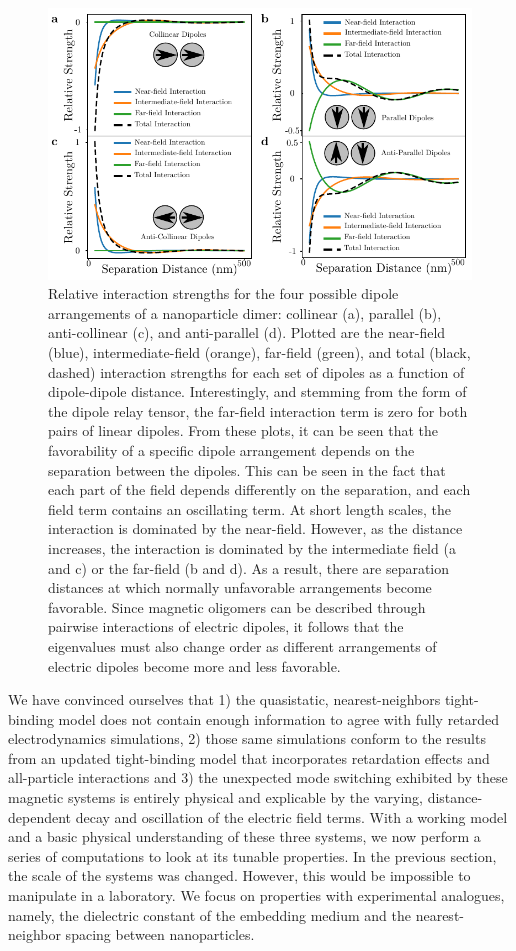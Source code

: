 \documentclass[journal=apchd5,manuscript=article]{achemso}
\begin{document}
\begin{figure}
\centering
\includegraphics[width=0.6\paperwidth]{dimer_interaction.pdf}
\caption{Relative interaction strengths for the four possible dipole arrangements of a nanoparticle dimer: collinear (a), parallel (b), anti-collinear (c), and anti-parallel (d). Plotted are the near-field (blue), intermediate-field (orange), far-field (green), and total (black, dashed) interaction strengths for each set of dipoles as a function of dipole-dipole distance. Interestingly, and stemming from the form of the dipole relay tensor, the far-field interaction term is zero for both pairs of linear dipoles. From these plots, it can be seen that the favorability of a specific dipole arrangement depends on the separation between the dipoles. This can be seen in the fact that each part of the field depends differently on the separation, and each field term contains an oscillating term. At short length scales, the interaction is dominated by the near-field. However, as the distance increases, the interaction is dominated by the intermediate field (a and c) or the far-field (b and d). As a result, there are separation distances at which normally unfavorable arrangements become favorable. Since magnetic oligomers can be described through pairwise interactions of electric dipoles, it follows that the eigenvalues must also change order as different arrangements of electric dipoles become more and less favorable.}
\label{dimers}
\end{figure}

We have convinced ourselves that 1) the quasistatic, nearest-neighbors tight-binding model does not contain enough information to agree with fully retarded electrodynamics simulations, 2) those same simulations conform to the results from an updated tight-binding model that incorporates retardation effects and all-particle interactions and 3) the unexpected mode switching exhibited by these magnetic systems is entirely physical and explicable by the varying, distance-dependent decay and oscillation of the electric field terms. With a working model and a basic physical understanding of these three systems, we now perform a series of computations to look at its tunable properties. In the previous section, the scale of the systems was changed. However, this would be impossible to manipulate in a laboratory. We focus on properties with experimental analogues, namely, the dielectric constant of the embedding medium and the nearest-neighbor spacing between nanoparticles.
\end{document}
